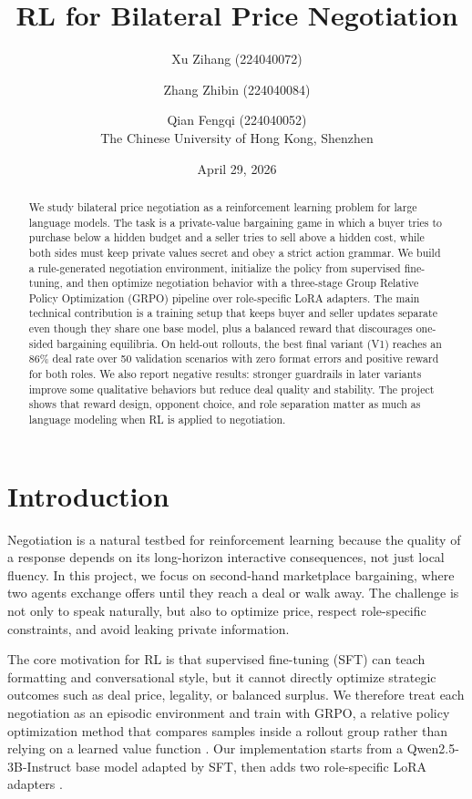 \documentclass[11pt]{article}
\title{RL for Bilateral Price Negotiation}
\author{
Xu Zihang (224040072) \and
Zhang Zhibin (224040084) \and
Qian Fengqi (224040052)\\
The Chinese University of Hong Kong, Shenzhen
}
\date{April 29, 2026}
\begin{document}
\maketitle

\begin{abstract}
We study bilateral price negotiation as a reinforcement learning problem for large language models. The task is a private-value bargaining game in which a buyer tries to purchase below a hidden budget and a seller tries to sell above a hidden cost, while both sides must keep private values secret and obey a strict action grammar. We build a rule-generated negotiation environment, initialize the policy from supervised fine-tuning, and then optimize negotiation behavior with a three-stage Group Relative Policy Optimization (GRPO) pipeline over role-specific LoRA adapters. The main technical contribution is a training setup that keeps buyer and seller updates separate even though they share one base model, plus a balanced reward that discourages one-sided bargaining equilibria. On held-out rollouts, the best final variant (V1) reaches an 86\% deal rate over 50 validation scenarios with zero format errors and positive reward for both roles. We also report negative results: stronger guardrails in later variants improve some qualitative behaviors but reduce deal quality and stability. The project shows that reward design, opponent choice, and role separation matter as much as language modeling when RL is applied to negotiation.
\end{abstract}

\section{Introduction}

Negotiation is a natural testbed for reinforcement learning because the quality of a response depends on its long-horizon interactive consequences, not just local fluency. In this project, we focus on second-hand marketplace bargaining, where two agents exchange offers until they reach a deal or walk away. The challenge is not only to speak naturally, but also to optimize price, respect role-specific constraints, and avoid leaking private information.

The core motivation for RL is that supervised fine-tuning (SFT) can teach formatting and conversational style, but it cannot directly optimize strategic outcomes such as deal price, legality, or balanced surplus. We therefore treat each negotiation as an episodic environment and train with GRPO, a relative policy optimization method that compares samples inside a rollout group rather than relying on a learned value function \citep{shaobing2024deepseekmath}. Our implementation starts from a Qwen2.5-3B-Instruct base model adapted by SFT, then adds two role-specific LoRA adapters \citep{qwen2025technicalreport,hu2022lora}.
\end{document}
